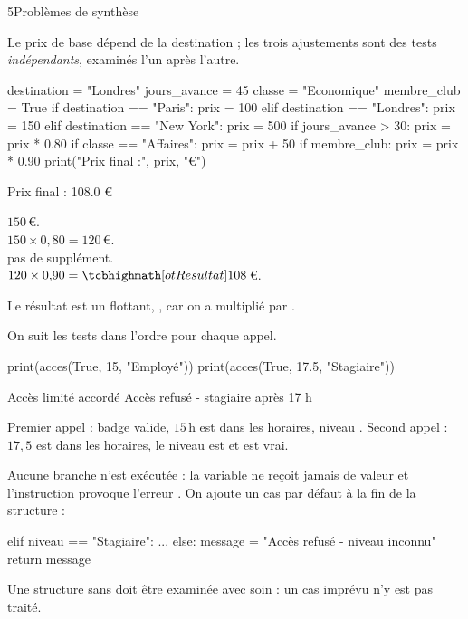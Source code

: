 \begin{corrige}{5}{Problèmes de synthèse}
\begin{questions}
  \item Le prix de base dépend de la destination ; les trois ajustements sont des tests  \emph{indépendants}, examinés l'un
    après l'autre.
\begin{codecote}
\begin{pythoncol}
destination = "Londres"
jours_avance = 45
classe = "Economique"
membre_club = True
if destination == "Paris":
    prix = 100
elif destination == "Londres":
    prix = 150
elif destination == "New York":
    prix = 500
if jours_avance > 30:
    prix = prix * 0.80
if classe == "Affaires":
    prix = prix + 50
if membre_club:
    prix = prix * 0.90
print("Prix final :", prix, "€")
\end{pythoncol}
\cote
\begin{consolecol}
Prix final : 108.0 €
\end{consolecol}

\medskip
{} $150$\,€.\\[0.6mm]
 $150\times0{,}80=120$\,€.\\[0.6mm]
 pas de supplément.\\[0.6mm]
 $120\times0{,}90=\res{108}$\,€.

\medskip
Le résultat est un flottant, , car on a multiplié par .
\end{codecote}
\end{questions}
\begin{questions}[start=2]
  \item On suit les tests dans l'ordre pour chaque appel.
\begin{python}
print(acces(True, 15, "Employé"))
print(acces(True, 17.5, "Stagiaire"))
\end{python}
\begin{console}
Accès limité accordé
Accès refusé - stagiaire après 17 h
\end{console}
    Premier appel : badge valide, $15$\,h est dans les horaires, niveau . Second appel : $17{,}5$ est dans les horaires,
    le niveau est  et  est vrai.
  \item Aucune branche n'est exécutée : la variable  ne reçoit jamais de valeur et l'instruction 
    provoque l'erreur . On ajoute un cas par défaut à la fin de la structure :
\begin{python}
    elif niveau == "Stagiaire":
        ...
    else:
        message = "Accès refusé - niveau inconnu"
    return message
\end{python}
    Une structure  sans  doit être examinée avec soin : un cas imprévu n'y est pas traité.
\end{questions}
\end{corrige}

